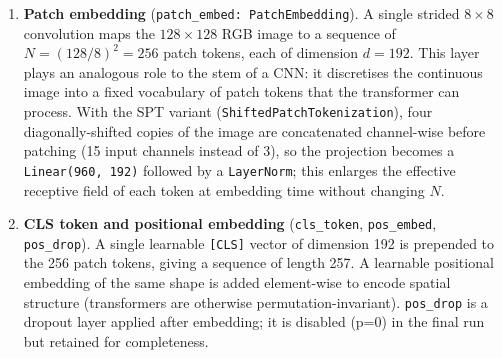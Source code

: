 \documentclass[11pt]{article}
\begin{document}
\begin{enumerate}
    \item \textbf{Patch embedding} (\texttt{patch\_embed: PatchEmbedding}). A single strided $8\times 8$ convolution maps the $128\times 128$ RGB image to a sequence of $N = (128/8)^2 = 256$ patch tokens, each of dimension $d = 192$. This layer plays an analogous role to the stem of a CNN: it discretises the continuous image into a fixed vocabulary of patch tokens that the transformer can process. With the SPT variant (\texttt{ShiftedPatchTokenization}), four diagonally-shifted copies of the image are concatenated channel-wise before patching (15 input channels instead of 3), so the projection becomes a \texttt{Linear(960, 192)} followed by a \texttt{LayerNorm}; this enlarges the effective receptive field of each token at embedding time without changing $N$.

    \item \textbf{CLS token and positional embedding} (\texttt{cls\_token}, \texttt{pos\_embed}, \texttt{pos\_drop}). A single learnable \texttt{[CLS]} vector of dimension 192 is prepended to the 256 patch tokens, giving a sequence of length 257. A learnable positional embedding of the same shape is added element-wise to encode spatial structure (transformers are otherwise permutation-invariant). \texttt{pos\_drop} is a dropout layer applied after embedding; it is disabled (p=0) in the final run but retained for completeness.


\end{enumerate}
\end{document}
